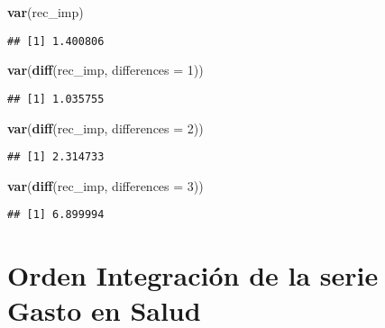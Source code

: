 \documentclass[]{book}
\newenvironment{Shaded}{\begin{snugshade}}{\end{snugshade}}
\newcommand{\KeywordTok}[1]{\textcolor[rgb]{0.13,0.29,0.53}{\textbf{#1}}}
\newcommand{\DataTypeTok}[1]{\textcolor[rgb]{0.13,0.29,0.53}{#1}}
\newcommand{\DecValTok}[1]{\textcolor[rgb]{0.00,0.00,0.81}{#1}}
\newcommand{\StringTok}[1]{\textcolor[rgb]{0.31,0.60,0.02}{#1}}
\newcommand{\NormalTok}[1]{#1}
\theoremstyle{definition}
\theoremstyle{definition}
\theoremstyle{definition}
\theoremstyle{remark}
\begin{document}
\begin{Shaded}
\begin{Highlighting}[]
\KeywordTok{var}\NormalTok{(rec_imp)}
\end{Highlighting}
\end{Shaded}

\begin{verbatim}
## [1] 1.400806
\end{verbatim}

\begin{Shaded}
\begin{Highlighting}[]
\KeywordTok{var}\NormalTok{(}\KeywordTok{diff}\NormalTok{(rec_imp, }\DataTypeTok{differences =} \DecValTok{1}\NormalTok{))}
\end{Highlighting}
\end{Shaded}

\begin{verbatim}
## [1] 1.035755
\end{verbatim}

\begin{Shaded}
\begin{Highlighting}[]
\KeywordTok{var}\NormalTok{(}\KeywordTok{diff}\NormalTok{(rec_imp, }\DataTypeTok{differences =} \DecValTok{2}\NormalTok{))}
\end{Highlighting}
\end{Shaded}

\begin{verbatim}
## [1] 2.314733
\end{verbatim}

\begin{Shaded}
\begin{Highlighting}[]
\KeywordTok{var}\NormalTok{(}\KeywordTok{diff}\NormalTok{(rec_imp, }\DataTypeTok{differences =} \DecValTok{3}\NormalTok{))}
\end{Highlighting}
\end{Shaded}

\begin{verbatim}
## [1] 6.899994
\end{verbatim}

\chapter{Orden Integración de la serie Gasto en
Salud}\label{orden-integracion-de-la-serie-gasto-en-salud}

\begin{Shaded}
\end{Shaded}
\end{document}
